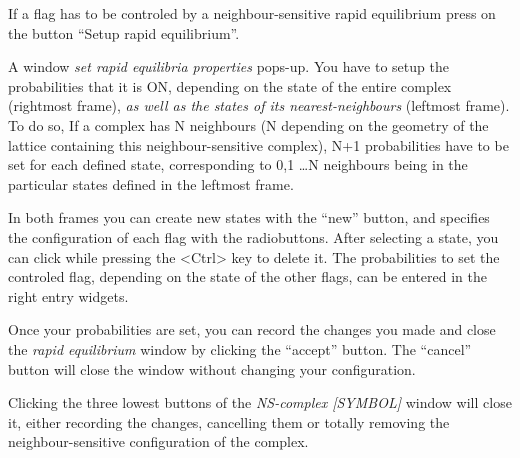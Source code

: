 If a flag has to be controled by a neighbour-sensitive rapid equilibrium press
on the button ``Setup rapid equilibrium''.

 A window \emph{set
  rapid equilibria properties} pops-up. You have to setup the probabilities that
it is ON, depending on the state of the entire complex (rightmost frame),
\emph{as well as the states of its nearest-neighbours} (leftmost frame). To do
so, If a complex has N neighbours (N depending on the geometry of the lattice
containing this neighbour-sensitive complex), N+1 probabilities have to be set
for each defined state, corresponding to 0,1 \ldots N neighbours being in the
particular states defined in the leftmost frame.

In both frames you can create new states with the ``new'' button, and specifies
the configuration of each flag with the radiobuttons. After selecting a state,
you can click while pressing the <Ctrl> key to delete it. The probabilities to
set the controled flag, depending on the state of the other flags, can be
entered in the right entry widgets.

Once your probabilities are set, you can record the changes you made and close
the \emph{rapid equilibrium} window by clicking the ``accept'' button. The
``cancel'' button will close the window without changing your configuration.

Clicking the three lowest buttons of the \emph{NS-complex [SYMBOL]} window will
close it, either recording the changes, cancelling them or totally removing the
neighbour-sensitive configuration of the complex.

